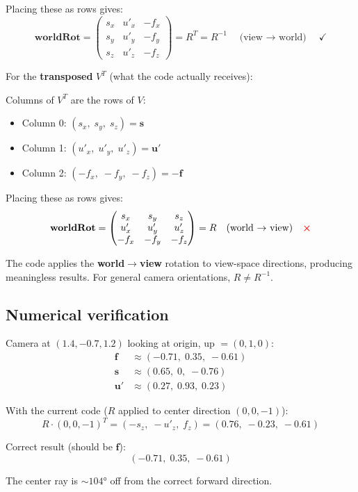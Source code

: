 \documentclass{article}
\begin{document}
Placing these as rows gives:
\[
\mathbf{worldRot} = \begin{pmatrix}
s_x  & u'_x & -f_x \\
s_y  & u'_y & -f_y \\
s_z  & u'_z & -f_z
\end{pmatrix} = R^T = R^{-1} \quad \text{(view $\to$ world)} \quad \checkmark
\]

For the \textbf{transposed} $V^T$ (what the code actually receives):

Columns of $V^T$ are the rows of $V$:
\begin{itemize}
\item Column 0: $(s_x,\; s_y,\; s_z) = \mathbf{s}$
\item Column 1: $(u'_x,\; u'_y,\; u'_z) = \mathbf{u'}$
\item Column 2: $(-f_x,\; -f_y,\; -f_z) = -\mathbf{f}$
\end{itemize}

Placing these as rows gives:
\[
\mathbf{worldRot} = \begin{pmatrix}
s_x  & s_y  & s_z  \\
u'_x & u'_y & u'_z \\
-f_x & -f_y & -f_z
\end{pmatrix} = R \quad \text{(world $\to$ view)} \quad \color{red}\boldsymbol{\times}
\]

The code applies the \textbf{world$\to$view} rotation to view-space directions,
producing meaningless results. For general camera orientations, $R \ne R^{-1}$.

\subsection{Numerical verification}

Camera at $(1.4, -0.7, 1.2)$ looking at origin, up $= (0, 1, 0)$:
\begin{align*}
\mathbf{f} &\approx (-0.71,\; 0.35,\; -0.61) \\
\mathbf{s} &\approx (0.65,\; 0,\; -0.76) \\
\mathbf{u'} &\approx (0.27,\; 0.93,\; 0.23)
\end{align*}

With the current code ($R$ applied to center direction $(0, 0, -1)$):
\[
R \cdot (0, 0, -1)^T = (-s_z,\; -u'_z,\; f_z) = (0.76,\; -0.23,\; -0.61)
\]

Correct result (should be $\mathbf{f}$):
\[
(-0.71,\; 0.35,\; -0.61)
\]

The center ray is $\sim\!104°$ off from the correct forward direction.
\end{document}

